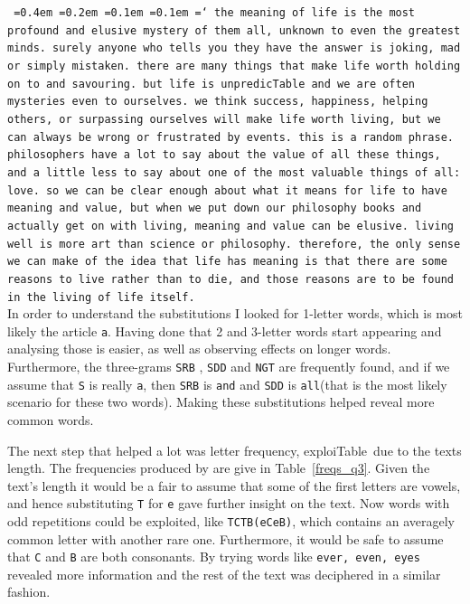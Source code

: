 \documentclass[12pt,a4paper,onecolumn]{article}
\newcommand*\justify{%
  \fontdimen2\font=0.4em%
  \fontdimen3\font=0.2em%
  \fontdimen4\font=0.1em%
  \fontdimen7\font=0.1em%
  \hyphenchar\font=`\-%
}
\begin{document}
\texttt{\justify{the meaning of life is the most profound and elusive mystery of them all, unknown to even the greatest minds. surely anyone who tells you they have the answer is joking, mad or simply mistaken. there are many things that make life worth holding on to and savouring. but life is unpredicTable~and we are often mysteries even to ourselves. we think success, happiness, helping others, or surpassing ourselves will make life worth living, but we can always be wrong or frustrated by events. this is a random phrase. philosophers have a lot to say about the value of all these things, and a little less to say about one of the most valuable things of all: love. so we can be clear enough about what it means for life to have meaning and value, but when we put down our philosophy books and actually get on with living, meaning and value can be elusive. living well is more art than science or philosophy. therefore, the only sense we can make of the idea that life has meaning is that there are some reasons to live rather than to die, and those reasons are to be found in the living of life itself.}}\\

In order to understand the substitutions I looked for 1-letter words, which is most likely the article \texttt{a}. Having done that 2 and 3-letter words start appearing and analysing those is easier, as well as observing effects on longer words. Furthermore, the three-grams \texttt{SRB} , \texttt{SDD} and \texttt{NGT} are frequently found, and if we assume that \texttt{S} is really \texttt{a}, then \texttt{SRB} is \texttt{and} and \texttt{SDD} is \texttt{all}(that is the most likely scenario for these two words). Making these substitutions helped reveal more common words.

The next step that helped a lot was letter frequency, exploiTable~due to the texts length. The frequencies produced by \citep{tool:design215} are give in Table~\ref{freqs_q3}. Given the text's length it would be a fair to assume that some of the first letters are vowels, and hence substituting \texttt{T} for \texttt{e} gave further insight on the text. Now words with odd repetitions could be exploited, like \texttt{TCTB(eCeB)}, which contains an averagely common letter with another rare one. Furthermore, it would be safe to assume that \texttt{C} and \texttt{B} are both consonants. By trying words like \texttt{ever, even, eyes} revealed more information and the rest of the text was deciphered in a similar fashion.
 
\end{document}
